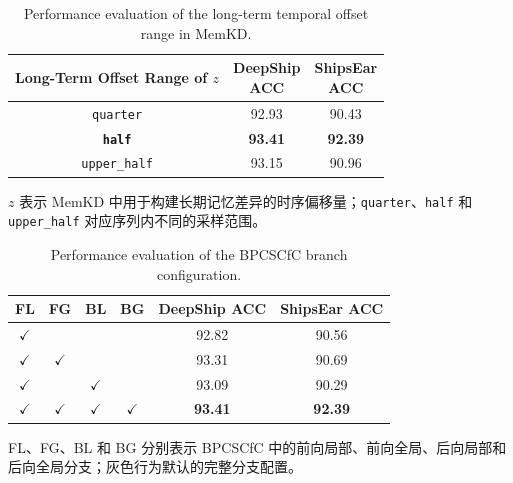 \documentclass[a4paper, 12pt]{article}
\begin{document}
\begin{table}[htbp]
\centering
\caption{Performance evaluation of the long-term temporal offset range in MemKD.}
\label{tab:z_random_range_analysis}
\small
\setlength{\tabcolsep}{10pt}
\begin{tabular}{c|c|c}
\toprule
\makecell{Long-Term Offset\\Range of $z$} &
\makecell{DeepShip\\ACC} &
\makecell{ShipsEar\\ACC} \\
\midrule
\texttt{quarter} & 92.93 & 90.43 \\
\rowcolor{gray!15}
\textbf{\texttt{half}} & \textbf{93.41} & \textbf{92.39} \\
\texttt{upper\_half} & 93.15 & 90.96 \\
\bottomrule
\end{tabular}
\vspace{0.5ex}
\par\footnotesize $z$ 表示 MemKD 中用于构建长期记忆差异的时序偏移量；\texttt{quarter}、\texttt{half} 和 \texttt{upper\_half} 对应序列内不同的采样范围。
\end{table}

\begin{table}[htbp]
\centering
\small
\caption{Performance evaluation of the BPCSCfC branch configuration.}
\label{tab:cfc_branch_analysis}
\setlength{\tabcolsep}{10pt}

\begin{tabular}{c|c|c|c|c|c}
\toprule
FL & FG & BL & BG & DeepShip ACC & ShipsEar ACC \\
\midrule
$\checkmark$ &              &              &              & 92.82 & 90.56 \\
$\checkmark$ & $\checkmark$ &              &              & 93.31 & 90.69 \\
$\checkmark$ &              & $\checkmark$ &              & 93.09 & 90.29 \\
\rowcolor{gray!15}
$\checkmark$ & $\checkmark$ & $\checkmark$ & $\checkmark$ & \textbf{93.41} & \textbf{92.39} \\
\bottomrule
\end{tabular}

\vspace{2mm}

\begin{flushleft}
\footnotesize
FL、FG、BL 和 BG 分别表示 BPCSCfC 中的前向局部、前向全局、后向局部和后向全局分支；灰色行为默认的完整分支配置。
\end{flushleft}

\end{table}
\end{document}
